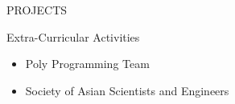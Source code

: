 \documentclass{resume} %
\begin{document}
\begin{rSection}{PROJECTS}


\end{rSection} 

\begin{rSection}{Extra-Curricular Activities} 
\begin{itemize} %
    \item 	Poly Programming Team
    \item   Society of Asian Scientists and Engineers

\end{itemize}


\end{rSection}
\end{document}
